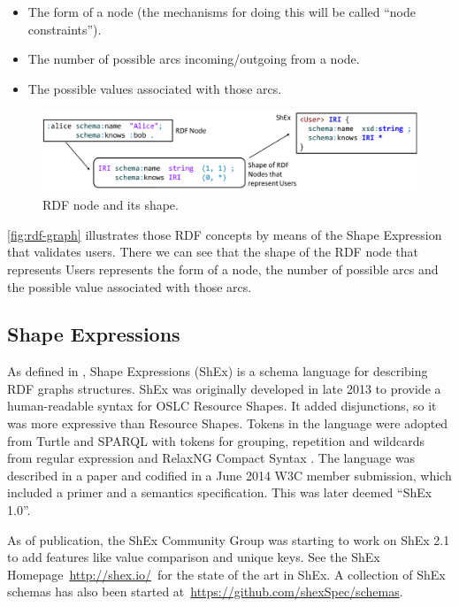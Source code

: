 \begin{itemize}
 \item The form of a node (the mechanisms for doing this will be called “node constraints”).
 \item The number of possible arcs incoming/outgoing from a node.
 \item The possible values associated with those arcs.
\end{itemize}

\begin{figure}
  \includegraphics[scale=0.25]{images/rdf-node-and-shape.png}
  \centering
  \caption[RDF node and its shape]{RDF node and its shape.}
  \label{fig:rdf-graph-2}
\end{figure}

\cref{fig:rdf-graph} illustrates those RDF concepts by means of the Shape Expression that validates users.
There we can see that the shape of the RDF node that represents Users represents the form of a node,
the number of possible arcs and the possible value associated with those arcs.

\subsection{Shape Expressions}
As defined in \cite{labra-validating-rdf}, Shape Expressions (ShEx) is a schema language for describing RDF
graphs structures. ShEx was originally developed in late 2013 to provide a human-readable syntax for OSLC
Resource Shapes. It added disjunctions, so it was more expressive than Resource Shapes. Tokens in the language
were adopted from Turtle and SPARQL with tokens for grouping, repetition and wildcards from regular expression
and RelaxNG Compact Syntax \cite{van2003relax}. The language was described in a paper
\cite{eric-rdf-validation-lang} and codified in a June 2014 W3C member submission, which included a primer and
a semantics specification. This was later deemed “ShEx 1.0”.

As of publication, the ShEx Community Group was starting to work on ShEx 2.1 to add features like value comparison
and unique keys. See the ShEx Homepage \url{http://shex.io/} for the state of the art in ShEx. A collection of
ShEx schemas has also been started at \url{https://github.com/shexSpec/schemas}.

